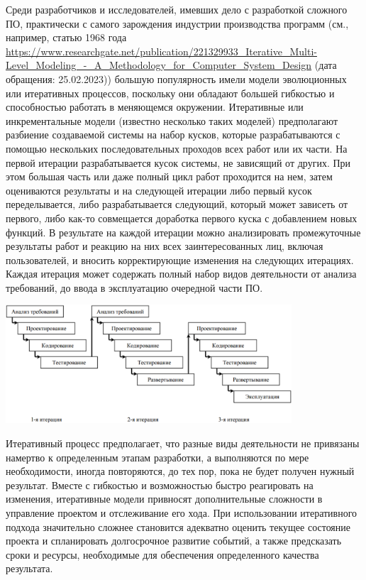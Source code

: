 \documentclass{../../text-style}
\begin{document}
Среди разработчиков и исследователей, имевших дело с разработкой сложного ПО, практически с самого зарождения индустрии производства программ (см., например, статью 1968 года \url{https://www.researchgate.net/publication/221329933_Iterative_Multi-Level_Modeling_-_A_Methodology_for_Computer_System_Design} (дата обращения: 25.02.2023)) большую популярность имели модели эволюционных или итеративных процессов, поскольку они обладают большей гибкостью и способностью работать в меняющемся окружении.
Итеративные или инкрементальные модели (известно несколько таких моделей) предполагают разбиение создаваемой системы на набор кусков, которые разрабатываются с помощью нескольких последовательных проходов всех работ или их части.
На первой итерации разрабатывается кусок системы, не зависящий от других.
При этом большая часть или даже полный цикл работ проходится на нем, затем оцениваются результаты и на следующей итерации либо первый кусок переделывается, либо разрабатывается следующий, который может зависеть от первого, либо как-то совмещается доработка первого куска с добавлением новых функций.
В результате на каждой итерации можно анализировать промежуточные результаты работ и реакцию на них всех заинтересованных лиц, включая пользователей, и вносить корректирующие изменения на следующих итерациях.
Каждая итерация может содержать полный набор видов деятельности от анализа требований, до ввода в эксплуатацию очередной части ПО. 

\begin{center}
    \includegraphics[width=0.8\textwidth]{iterativeModel.png}
\end{center}

Итеративный процесс предполагает, что разные виды деятельности не привязаны намертво к определенным этапам разработки, а выполняются по мере необходимости, иногда повторяются, до тех пор, пока не будет получен нужный результат.
Вместе с гибкостью и возможностью быстро реагировать на изменения, итеративные модели привносят дополнительные сложности в управление проектом и отслеживание его хода.
При использовании итеративного подхода значительно сложнее становится адекватно оценить текущее состояние проекта и спланировать долгосрочное развитие событий, а также предсказать сроки и ресурсы, необходимые для обеспечения определенного качества результата.
\end{document}
